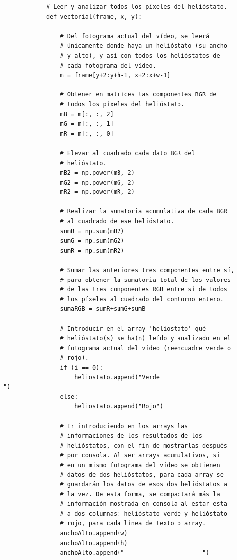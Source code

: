 \begin{lstlisting}
            # Leer y analizar todos los píxeles del helióstato.
            def vectorial(frame, x, y):
            
                # Del fotograma actual del vídeo, se leerá
                # únicamente donde haya un helióstato (su ancho
                # y alto), y así con todos los helióstatos de
                # cada fotograma del vídeo.
                m = frame[y+2:y+h-1, x+2:x+w-1]
                
                # Obtener en matrices las componentes BGR de
                # todos los píxeles del helióstato.
                mB = m[:, :, 2]
                mG = m[:, :, 1]
                mR = m[:, :, 0]
                                
                # Elevar al cuadrado cada dato BGR del
                # helióstato.
                mB2 = np.power(mB, 2)
                mG2 = np.power(mG, 2)
                mR2 = np.power(mR, 2)
                
                # Realizar la sumatoria acumulativa de cada BGR
                # al cuadrado de ese helióstato.
                sumB = np.sum(mB2)
                sumG = np.sum(mG2)
                sumR = np.sum(mR2)

                # Sumar las anteriores tres componentes entre sí,
                # para obtener la sumatoria total de los valores
                # de las tres componentes RGB entre sí de todos
                # los píxeles al cuadrado del contorno entero.
                sumaRGB = sumR+sumG+sumB
                
                # Introducir en el array 'heliostato' qué
                # helióstato(s) se ha(n) leído y analizado en el
                # fotograma actual del vídeo (reencuadre verde o
                # rojo).
                if (i == 0):
                    heliostato.append("Verde                           ")
                else:
                    heliostato.append("Rojo")
                
                # Ir introduciendo en los arrays las
                # informaciones de los resultados de los
                # helióstatos, con el fin de mostrarlas después
                # por consola. Al ser arrays acumulativos, si
                # en un mismo fotograma del vídeo se obtienen
                # datos de dos helióstatos, para cada array se
                # guardarán los datos de esos dos helióstatos a
                # la vez. De esta forma, se compactará más la
                # información mostrada en consola al estar esta
                # a dos columnas: helióstato verde y helióstato
                # rojo, para cada línea de texto o array.
                anchoAlto.append(w)
                anchoAlto.append(h)
                anchoAlto.append("                      ")
                

\end{lstlisting}
